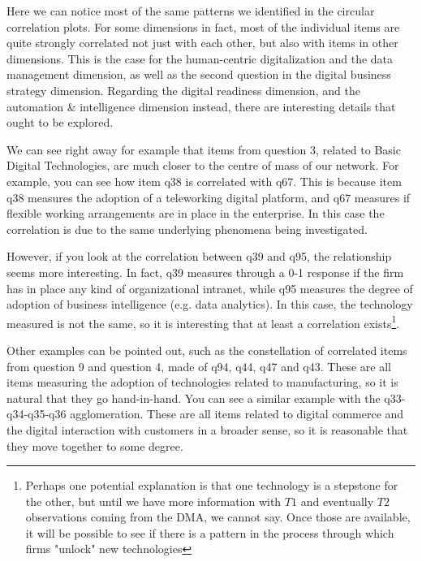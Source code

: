\documentclass[12pt]{report}
\begin{document}
\par Here we can notice most of the same patterns we identified in the circular correlation plots. For some dimensions in fact, most of the individual items are quite strongly correlated not just with each other, but also with items in other dimensions. This is the case for the human-centric digitalization and the data management dimension, as well as the second question in the digital business strategy dimension. Regarding the digital readiness dimension, and the automation \& intelligence dimension instead, there are interesting details that ought to be explored.

\par We can see right away for example that items from question 3, related to Basic Digital Technologies, are much closer to the centre of mass of our network. For example, you can see how item q38 is correlated with q67. This is because item q38 measures the adoption of a teleworking digital platform, and q67 measures if flexible working arrangements are in place in the enterprise. In this case the correlation is due to the same underlying phenomena being investigated.

\par However, if you look at the correlation between q39 and q95, the relationship seems more interesting. In fact, q39 measures through a 0-1 response if the firm has in place any kind of organizational intranet, while q95 measures the degree of adoption of business intelligence (e.g. data analytics). In this case, the technology measured is not the same, so it is interesting that at least a correlation exists\footnote{Perhaps one potential explanation is that one technology is a stepstone for the other, but until we have more information with $T1$ and eventually $T2$ observations coming from the DMA, we cannot say. Once those are available, it will be possible to see if there is a pattern in the process through which firms "unlock" new technologies}.

\par Other examples can be pointed out, such as the constellation of correlated items from question 9 and question 4, made of q94, q44, q47 and q43. These are all items measuring the adoption of technologies related to manufacturing, so it is natural that they go hand-in-hand. You can see a similar example with the q33-q34-q35-q36 agglomeration. These are all items related to digital commerce and the digital interaction with customers in a broader sense, so it is reasonable that they move together to some degree.
\end{document}
